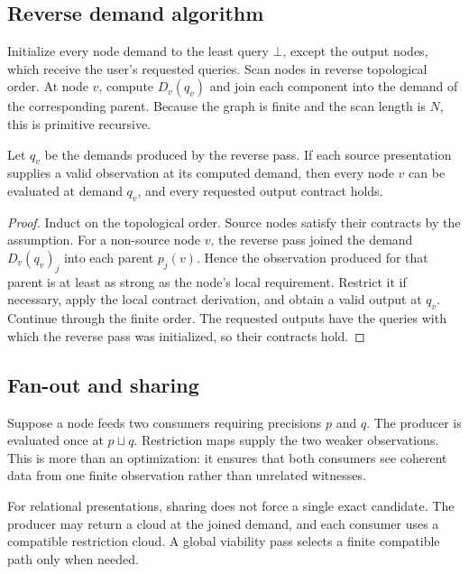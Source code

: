 \subsection{Reverse demand algorithm}

Initialize every node demand to the least query \(\bot\), except the output
nodes, which receive the user's requested queries.  Scan nodes in reverse
topological order.  At node \(v\), compute \(D_v(q_v)\) and join each component
into the demand of the corresponding parent.  Because the graph is finite and
the scan length is \(N\), this is primitive recursive.

\begin{theorem}
\label{thm:demandsound}
Let \(q_v\) be the demands produced by the reverse pass.  If each source
presentation supplies a valid observation at its computed demand, then every
node \(v\) can be evaluated at demand \(q_v\), and every requested output
contract holds.
\end{theorem}

\begin{proof}
Induct on the topological order.  Source nodes satisfy their contracts by the
assumption.  For a non-source node \(v\), the reverse pass joined the demand
\(D_v(q_v)_j\) into each parent \(p_j(v)\).  Hence the observation produced for
that parent is at least as strong as the node's local requirement.  Restrict it
if necessary, apply the local contract derivation, and obtain a valid output at
\(q_v\).  Continue through the finite order.  The requested outputs have the
queries with which the reverse pass was initialized, so their contracts hold.
\end{proof}

\subsection{Fan-out and sharing}

Suppose a node feeds two consumers requiring precisions \(p\) and \(q\).  The
producer is evaluated once at \(p\sqcup q\).  Restriction maps supply the two
weaker observations.  This is more than an optimization: it ensures that both
consumers see coherent data from one finite observation rather than unrelated
witnesses.

For relational presentations, sharing does not force a single exact candidate.
The producer may return a cloud at the joined demand, and each consumer uses a
compatible restriction cloud.  A global viability pass selects a finite
compatible path only when needed.


